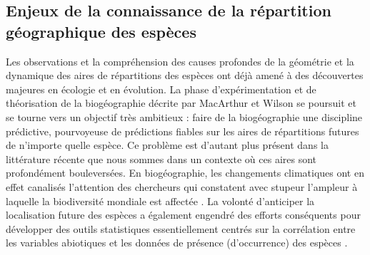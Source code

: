 \subsection*{Enjeux de la connaissance de la répartition géographique
des
espèces}\label{enjeux-de-la-connaissance-de-la-ruxe9partition-guxe9ographique-des-espuxe8ces}

Les observations et la compréhension des causes profondes de la
géométrie et la dynamique des aires de répartitions des espèces ont déjà
amené à des découvertes majeures en écologie et en évolution. La phase
d'expérimentation et de théorisation de la biogéographie décrite par
MacArthur et Wilson se poursuit et se tourne vers un objectif très
ambitieux : faire de la biogéographie une discipline prédictive,
pourvoyeuse de prédictions fiables sur les aires de répartitions futures
de n'importe quelle espèce. Ce problème est d'autant plus présent dans
la littérature récente que nous sommes dans un contexte où ces aires
sont profondément bouleversées. En biogéographie, les changements
climatiques ont en effet canalisés l'attention des chercheurs qui
constatent avec stupeur l'ampleur à laquelle la biodiversité mondiale
est affectée \citep[\citet{Bellard2012}]{Koh2004}. La volonté
d'anticiper la localisation future des espèces a également engendré des
efforts conséquents pour développer des outils statistiques
essentiellement centrés sur la corrélation entre les variables
abiotiques et les données de présence (d'occurrence) des espèces
\citep{Elith2006}.

